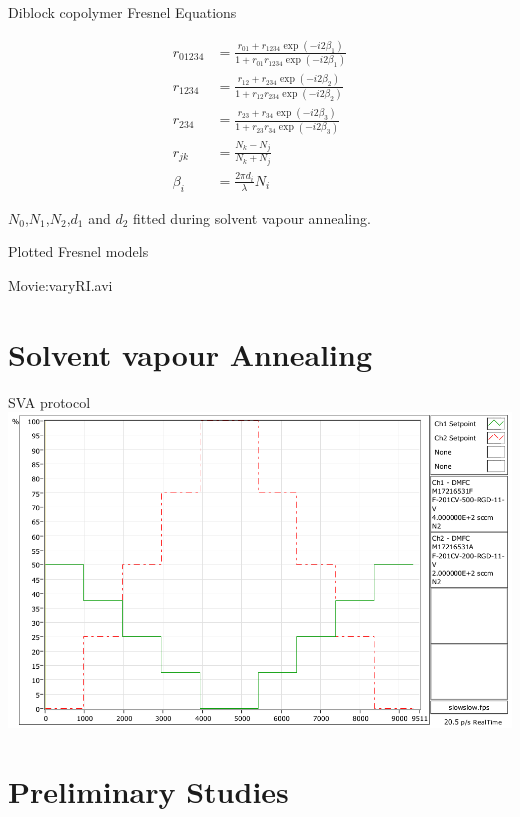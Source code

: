 \documentclass[10pt]{beamer}
\begin{document}
\begin{frame}{Diblock copolymer Fresnel Equations}

\begin{align*}
r_{01234}&= \frac{r_{01}+r_{1234}\exp(-i2\beta_1)}{1+r_{01}r_{1234}\exp(-i2\beta_1)} \\
r_{1234} &= \frac{r_{12}+r_{234}\exp(-i2\beta_2)}{1+r_{12}r_{234}\exp(-i2\beta_2)} \\
r_{234}  &= \frac{r_{23}+r_{34}\exp(-i2\beta_3)}{1+r_{23}r_{34}\exp(-i2\beta_3)} \\
r_{jk}   &= \frac{N_k-N_j}{N_k + N_j}\\  
\beta_i  &= \frac{2\pi d_i}{\lambda}N_i
\end{align*}

$N_0$,$N_1$,$N_2$,$d_1$ and $d_2$ fitted during solvent vapour annealing.
\end{frame}

\begin{frame}{Plotted Fresnel models}
\begin{center}
\Huge Movie:varyRI.avi
\end{center}
\end{frame}	

	\section{Solvent vapour Annealing}
\begin{frame}{SVA protocol}
\includegraphics[width=\textwidth]{slowslowprotocol.png}
\end{frame}


	\section{Preliminary Studies}
	
\end{document}
